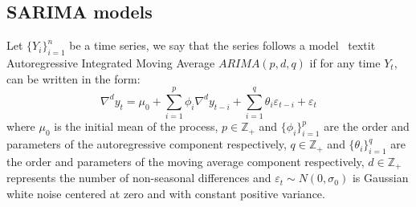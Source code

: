 \subsection{SARIMA models}
%
Let $\{Y_i \}_{i=1}^n$ be a time series, we say that the series follows a model \ textit {Autoregressive Integrated Moving Average} $ARIMA (p, d, q)$ if for any time $Y_t$, can be written in the form:
%
\begin{equation}\label{eq:ARIMA}
	\nabla^d y_t= \mu_0 + \sum_{i=1}^p \phi_i \nabla^d y_{t-i} + \sum_{i=1}^q \theta_i \varepsilon_{t-i} + \varepsilon_t
\end{equation}
%
where $\mu_0$ is the initial mean of the process, $p \in \mathbb{Z}_+$ and $\{\phi_i \}_{i = 1}^p$ are the order and parameters of the autoregressive component respectively, $q \in \mathbb{Z}_+$ and $\{\theta_i \}_{i = 1}^q$ are the order and parameters of the moving average component respectively, $d \in \mathbb{Z}_+$ represents the number of non-seasonal differences and $\varepsilon_t \sim N(0, \sigma_0)$ is Gaussian white noise centered at zero and with constant positive variance.

